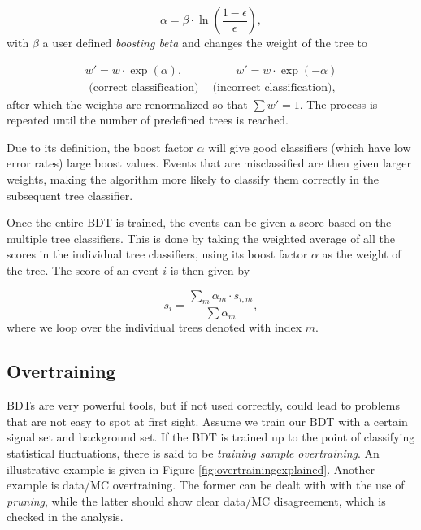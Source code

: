 \begin{equation}
\label{eq:boostfactor}
\alpha = \beta \cdot \ln\left(\frac{1-\epsilon}{\epsilon}\right),
\end{equation}
\noindent with $\beta$ a user defined \textit{boosting beta} and changes the weight of the tree to

\begin{equation}
\begin{split}
w' = w \cdot \exp(\alpha), \ \ \ \ \ \ \ \ \ \ \ \ \ \ \ \ \ \ \ \ \ w' = w \cdot \exp(-\alpha)\\
\textrm{ (correct classification)} \ \ \ \ \textrm{ (incorrect classification),}
\end{split}
\end{equation}
\noindent after which the weights are renormalized so that $\sum w' = 1$. The process is repeated until the number of predefined trees is reached.

Due to its definition, the boost factor $\alpha$ will give good classifiers (which have low error rates) large boost values. Events that are misclassified are then given larger weights, making the algorithm more likely to classify them correctly in the subsequent tree classifier.

Once the entire BDT is trained, the events can be given a score based on the multiple tree classifiers. This is done by taking the weighted average of all the scores in the individual tree classifiers, using its boost factor $\alpha$ as the weight of the tree. The score of an event $i$ is then given by

\begin{equation}
s_i = \frac{\sum_m \alpha_m \cdot s_{i,m}}{\sum \alpha_m},
\end{equation}
\noindent where we loop over the individual trees denoted with index $m$.

\subsection{Overtraining}
\label{subsec:overtraining}
BDTs are very powerful tools, but if not used correctly, could lead to problems that are not easy to spot at first sight. Assume we train our BDT with a certain signal set and background set. If the BDT is trained up to the point of classifying statistical fluctuations, there is said to be \textit{training sample overtraining}. An illustrative example is given in Figure \ref{fig:overtrainingexplained}. Another example is data/MC overtraining. The former can be dealt with with the use of \textit{pruning}, while the latter should show clear data/MC disagreement, which is checked in the analysis. 

